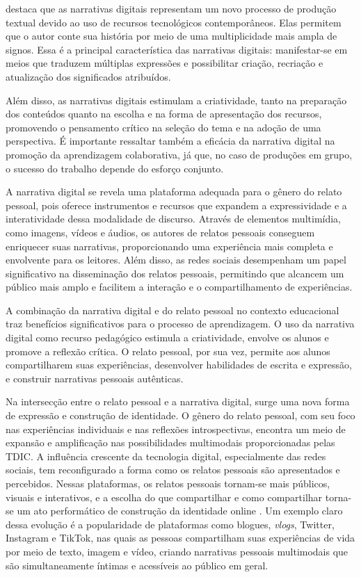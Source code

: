 \documentclass[portuguese]{textolivre}
\begin{document}
\textcite{santos2016} destaca que as narrativas digitais representam um novo processo de produção textual devido ao uso de recursos tecnológicos contemporâneos. Elas permitem que o autor conte sua história por meio de uma multiplicidade mais ampla de signos. Essa é a principal característica das narrativas digitais: manifestar-se em meios que traduzem múltiplas expressões e possibilitar criação, recriação e atualização dos significados atribuídos.

Além disso, as narrativas digitais estimulam a criatividade, tanto na preparação dos conteúdos quanto na escolha e na forma de apresentação dos recursos, promovendo o pensamento crítico na seleção do tema e na adoção de uma perspectiva. É importante ressaltar também a eficácia da narrativa digital na promoção da aprendizagem colaborativa, já que, no caso de produções em grupo, o sucesso do trabalho depende do esforço conjunto.

A narrativa digital se revela uma plataforma adequada para o gênero do relato pessoal, pois oferece instrumentos e recursos que expandem a expressividade e a interatividade dessa modalidade de discurso. Através de elementos multimídia, como imagens, vídeos e áudios, os autores de relatos pessoais conseguem enriquecer suas narrativas, proporcionando uma experiência mais completa e envolvente para os leitores. Além disso, as redes sociais desempenham um papel significativo na disseminação dos relatos pessoais, permitindo que alcancem um público mais amplo e facilitem a interação e o compartilhamento de experiências.

A combinação da narrativa digital e do relato pessoal no contexto educacional traz benefícios significativos para o processo de aprendizagem. O uso da narrativa digital como recurso pedagógico estimula a criatividade, envolve os alunos e promove a reflexão crítica. O relato pessoal, por sua vez, permite aos alunos compartilharem suas experiências, desenvolver habilidades de escrita e expressão, e construir narrativas pessoais autênticas.

Na intersecção entre o relato pessoal e a narrativa digital, surge uma nova forma de expressão e construção de identidade. O gênero do relato pessoal, com seu foco nas experiências individuais e nas reflexões introspectivas, encontra um meio de expansão e amplificação nas possibilidades multimodais proporcionadas pelas TDIC. A influência crescente da tecnologia digital, especialmente das redes sociais, tem reconfigurado a forma como os relatos pessoais são apresentados e percebidos. Nessas plataformas, os relatos pessoais tornam-se mais públicos, visuais e interativos, e a escolha do que compartilhar e como compartilhar torna-se um ato performático de construção da identidade online \cite{marwick2011tweet}. Um exemplo claro dessa evolução é a popularidade de plataformas como blogues, \emph{vlogs}, Twitter, Instagram e TikTok, nas quais as pessoas compartilham suas experiências de vida por meio de texto, imagem e vídeo, criando narrativas pessoais multimodais que são simultaneamente íntimas e acessíveis ao público em geral.
\end{document}
